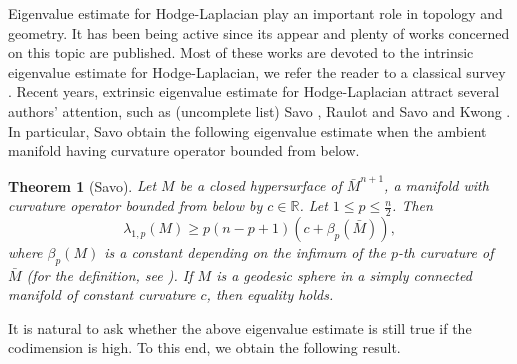 \documentclass[12pt]{amsart}
\theoremstyle{plain}
\newtheorem{known}{Theorem}
\theoremstyle{remark}
\theoremstyle{definition}
\numberwithin{equation}{section}
\begin{document}
Eigenvalue estimate for Hodge-Laplacian play an important role in topology and geometry.
It has been being active since  its appear and  plenty of
works concerned on this topic are published. Most of these works are devoted to the  intrinsic eigenvalue
estimate for Hodge-Laplacian, we refer the reader to a classical survey \cite{Cha84}.
Recent years,  extrinsic eigenvalue estimate for Hodge-Laplacian attract several authors' attention,
such as (uncomplete list) Savo \cite{Sav05,Sav14}, Raulot and Savo
\cite{RauSav11,RauSav12} and Kwong \cite{Kwo16}.
In particular, Savo obtain the following eigenvalue estimate when the ambient manifold having
curvature operator bounded from below.

\begin{known}[Savo\cite{Sav14}]
 Let $M$ be a closed hypersurface of $\bar{M}^{n+1}$, a manifold with
 curvature operator bounded from below by $c\in\mathbb R$. Let $ 1\le p \le \frac{n}{2}$. Then
$$
\lambda_{1,p}(M)\ge p(n-p+1)(c+\beta_p(\bar{M})),
$$
where $\beta_p(M)$ is a constant depending on the infimum of the $p$-th curvature
of $\bar{M}$ (for the definition, see \cite{Sav14}). If $M$ is a geodesic
sphere in a simply connected
manifold of constant curvature $c$, then equality holds.
\end{known}
It is natural to ask whether the above eigenvalue estimate is still true if the
codimension is high.
To this end, we obtain the following result.
\end{document}
